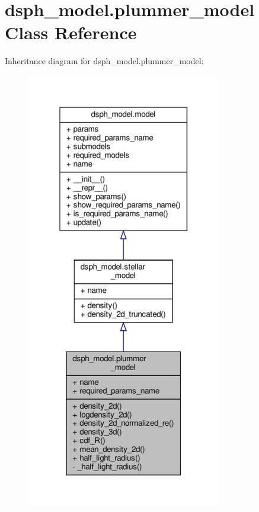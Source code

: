 \hypertarget{classdsph__model_1_1plummer__model}{}\section{dsph\+\_\+model.\+plummer\+\_\+model Class Reference}
\label{classdsph__model_1_1plummer__model}


Inheritance diagram for dsph\+\_\+model.\+plummer\+\_\+model\+:\nopagebreak
\begin{figure}[H]
\begin{center}
\leavevmode
\includegraphics[width=241pt]{d8/d28/classdsph__model_1_1plummer__model__inherit__graph}
\end{center}
\end{figure}


